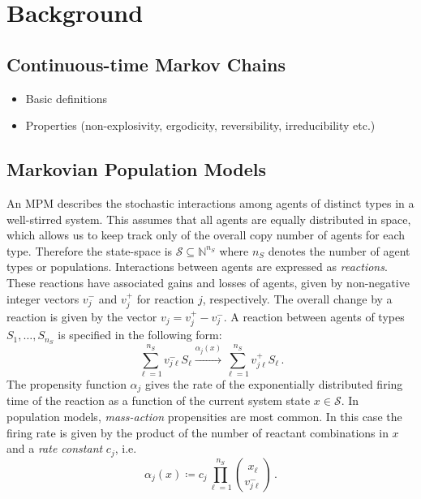 \chapter{Background}

\section{Continuous-time Markov Chains}
\begin{itemize}
   \item Basic definitions
   \item Properties (non-explosivity, ergodicity, reversibility, irreducibility etc.)
\end{itemize}

\section{Markovian Population Models}
An \acf{MPM}
describes the stochastic interactions
among agents of distinct types in a well-stirred system.
This assumes that all agents are equally distributed in space, which
allows us to keep track only of the overall copy number of agents for each type.
Therefore the state-space is $\mathcal{S}\subseteq\mathbb{N}^{n_S}$ where
$n_S$ denotes the number of agent types or populations.
Interactions between agents are expressed as \emph{reactions}.
These reactions have associated
gains and losses of agents, given by non-negative integer vectors   
${v}_j^{-}$ and ${v}_j^{+}$ for reaction $j$, respectively. The overall change by a reaction is given by the vector $v_j = v_j^+ - v_j^-$.
A reaction between agents of types $S_1,\dots, S_{n_S}$ is specified in the following form:
\begin{equation}\label{eq:reaction}
    \sum_{\ell=1}^{n_S} v_{j\ell}^{-} S_\ell
    \xrightarrow{\alpha_j( x)}
    \sum_{\ell=1}^{n_S} v_{j\ell}^{+} S_\ell\,.
\end{equation}
The propensity function $\alpha_j$ gives the rate of the exponentially distributed firing
time of the reaction as a function of the current system state $x\in \mathcal{S}$.
In population models, \emph{mass-action} propensities are most common.
In this case the firing rate is given by the product of the number
of reactant combinations in $x$ and a
\emph{rate constant} $c_j$, i.e.
\begin{equation}\label{eq:stoch_mass_action}
    \alpha_j({x})\coloneqq c_j\prod_{\ell=1}^{n_S}\binom{x_\ell}{v_{j\ell}^{-}}\,.
\end{equation}

